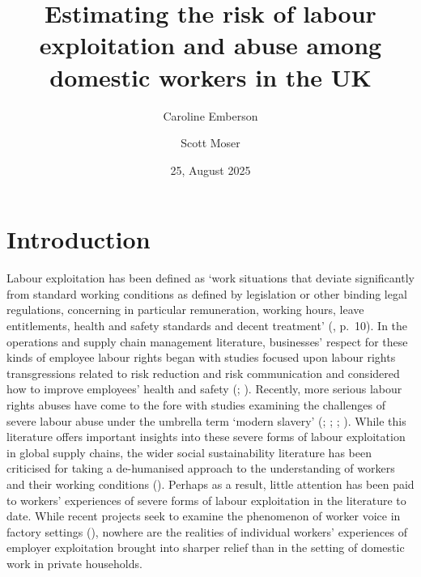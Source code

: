 \documentclass[
  12pt,
]{article}
\title{Estimating the risk of labour exploitation and abuse among
domestic workers in the UK}
\author{Caroline Emberson \and Scott Moser}
\date{25, August 2025}
\theoremstyle{plain}
\theoremstyle{definition}
\renewcommand*\contentsname{Table of contents}
\newcommand\contentsname{Table of contents}
\begin{document}
\maketitle

\renewcommand*\contentsname{Table of contents}
{
\hypersetup{linkcolor=}
\setcounter{tocdepth}{3}
\tableofcontents
}

\newpage

\section{Introduction}\label{introduction}

Labour exploitation has been defined as `work situations that deviate
significantly from standard working conditions as defined by legislation
or other binding legal regulations, concerning in particular
remuneration, working hours, leave entitlements, health and safety
standards and decent treatment'
(\textcite{european_union_for_fundamental_rights_severe_2015}, p.~10).
In the operations and supply chain management literature, businesses'
respect for these kinds of employee labour rights began with studies
focused upon labour rights transgressions related to risk reduction and
risk communication and considered how to improve employees' health and
safety (\textcite{chinander_aligning_2001};
\textcite{wolf_operationalizing_2001}). Recently, more serious labour
rights abuses have come to the fore with studies examining the
challenges of severe labour abuse under the umbrella term `modern
slavery' (\textcite{gold_modern_2015}; \textcite{new_modern_2015};
\textcite{benstead_horizontal_2018}; \textcite{stevenson_modern_2018}).
While this literature offers important insights into these severe forms
of labour exploitation in global supply chains, the wider social
sustainability literature has been criticised for taking a de-humanised
approach to the understanding of workers and their working conditions
(\textcite{soundararajan_humanizing_2021}). Perhaps as a result, little
attention has been paid to workers' experiences of severe forms of
labour exploitation in the literature to date. While recent projects
seek to examine the phenomenon of worker voice in factory settings
(\textcite{leverhulme_trust_research_2022}), nowhere are the realities
of individual workers' experiences of employer exploitation brought into
sharper relief than in the setting of domestic work in private
households.
\end{document}
